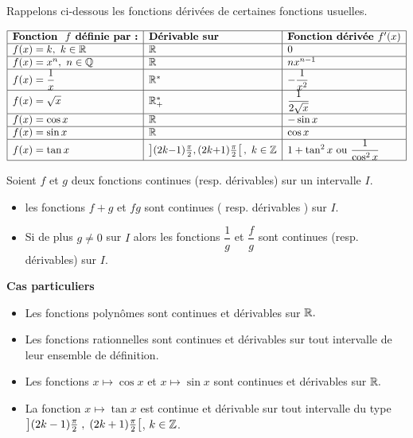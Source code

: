 Rappelons  ci-dessous les fonctions dérivées de certaines fonctions usuelles.


\medskip
$
\begin{array}{|l|l|l|}
\hline
\text{\textbf{Fonction } } f  \text{\textbf{ définie par :}} & 
\text{\textbf{Dérivable sur}} & 
\text{\textbf{Fonction dérivée }}  f'(x)  \\
\hline
f(x) = k,\ k \in \mathbb{R} & \mathbb{R} & 0 \\
\hline
f(x) = x^n,\ n \in \mathbb{Q} & \mathbb{R} & nx^{n-1} \\
\hline
f(x) = \dfrac{1}{x} & \mathbb{R}^* & -\dfrac{1}{x^2} \\
\hline
f(x) = \sqrt{x} & \mathbb{R}_+^* & \dfrac{1}{2\sqrt{x}} \\
\hline
f(x) = \cos x & \mathbb{R} & -\sin x \\
\hline
f(x) = \sin x & \mathbb{R} & \cos x \\
\hline
f(x) = \tan x & 
\small \left] (2k{-}1)\frac{\pi}{2}, (2k{+}1)\frac{\pi}{2} \right[,\ k \in \mathbb{Z}  & 
1 + \tan^2 x\ \text{ou}\ \dfrac{1}{\cos^2 x} \\
\hline
\end{array}
$




\begin{property}
Soient $f $ et  $ g$ deux fonctions continues (resp. dérivables) sur un intervalle $ I. $

\begin{itemize}
\item les fonctions $ f+g $ et $ fg $ sont continues ( resp. dérivables ) sur   $ I. $
\item  Si de plus $ g\neq0 $ sur  $ I $ alors les fonctions $\dfrac{1}{g} $ et  $\dfrac{f}{g} $ sont continues (resp. dérivables) sur $ I. $
\end{itemize}
\end{property}

\textbf{Cas particuliers}
\begin{itemize}
\item Les fonctions polynômes sont continues et dérivables sur $ \mathbb{R}. $ 
\item Les fonctions rationnelles sont continues et dérivables sur tout intervalle de leur ensemble de définition.
\item Les fonctions $x\mapsto\cos x $ et  $x\mapsto\sin x $ sont continues et dérivables sur $ \mathbb{R}. $
\item La fonction $x\mapsto\tan x $ est continue et dérivable sur tout intervalle du type $\left](2k-1)\frac{\pi}{2} \;,\; (2k+1)\frac{\pi}{2}\right[$, $ k\in\mathbb{Z} $.

\end{itemize}
